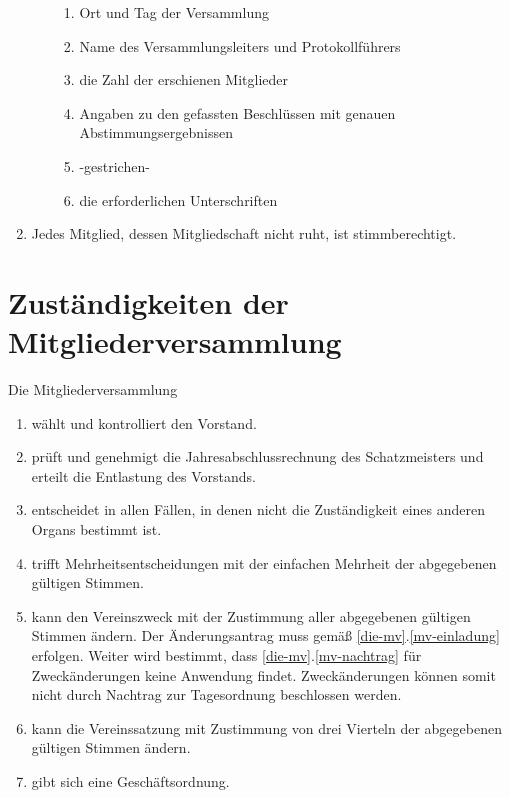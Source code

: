 \documentclass[a4paper, 12pt]{scrartcl}
\begin{document}
\begin{enumerate}
\begin{enumerate}
			\begin{enumerate}
	  		\item Ort und Tag der Versammlung
	    	\item Name des Versammlungsleiters und Protokollführers
	    	\item die Zahl der erschienen Mitglieder
	    	\item Angaben zu den gefassten Beschlüssen mit genauen Abstimmungsergebnissen
	    	\item -gestrichen-
	    	\item die erforderlichen Unterschriften
			\end{enumerate}
		\end{enumerate}
	\item Jedes Mitglied, dessen Mitgliedschaft nicht ruht, ist stimmberechtigt.
\end{enumerate}

\section{Zuständigkeiten der Mitgliederversammlung}
Die Mitgliederversammlung
\begin{enumerate}
	\item wählt und kontrolliert den Vorstand.
	\item prüft und genehmigt die Jahresabschlussrechnung des Schatzmeisters und erteilt die Entlastung des Vorstands.
	\item entscheidet in allen Fällen, in denen nicht die Zuständigkeit eines anderen Organs bestimmt ist.
	\item trifft Mehrheitsentscheidungen mit der einfachen Mehrheit der abgegebenen gültigen Stimmen.
	\item kann den Vereinszweck mit der Zustimmung aller abgegebenen gültigen Stimmen ändern.
	Der Änderungsantrag muss gemäß \ref{die-mv}.\ref{mv-einladung} erfolgen. 
	Weiter wird bestimmt, dass \ref{die-mv}.\ref{mv-nachtrag} für Zweckänderungen keine Anwendung findet.
 	Zweckänderungen können somit nicht durch Nachtrag zur Tagesordnung beschlossen werden.
	\item kann die Vereinssatzung mit Zustimmung von drei Vierteln der abgegebenen gültigen Stimmen ändern.	
	\item gibt sich eine Geschäftsordnung.
\end{enumerate}
\end{document}

